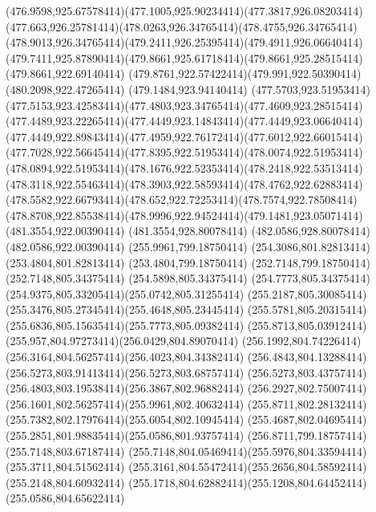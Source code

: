 {{	\curveto(476.9598,925.67578414)(477.1005,925.90234414)(477.3817,926.08203414)
	\curveto(477.663,926.25781414)(478.0263,926.34765414)(478.4755,926.34765414)
	\curveto(478.9013,926.34765414)(479.2411,926.25395414)(479.4911,926.06640414)
	\curveto(479.7411,925.87890414)(479.8661,925.61718414)(479.8661,925.28515414)
	\lineto(479.8661,922.69140414)
	\curveto(479.8761,922.57422414)(479.991,922.50390414)(480.2098,922.47265414)
	\closepath
	\moveto(479.1484,923.94140414)
	\lineto(477.5703,923.51953414)
	\curveto(477.5153,923.42583414)(477.4803,923.34765414)(477.4609,923.28515414)
	\curveto(477.4489,923.22265414)(477.4449,923.14843414)(477.4449,923.06640414)
	\curveto(477.4449,922.89843414)(477.4959,922.76172414)(477.6012,922.66015414)
	\curveto(477.7028,922.56645414)(477.8395,922.51953414)(478.0074,922.51953414)
	\curveto(478.0894,922.51953414)(478.1676,922.52353414)(478.2418,922.53513414)
	\curveto(478.3118,922.55463414)(478.3903,922.58593414)(478.4762,922.62883414)
	\curveto(478.5582,922.66793414)(478.652,922.72253414)(478.7574,922.78508414)
	\curveto(478.8708,922.85538414)(478.9996,922.94524414)(479.1481,923.05071414)
	\closepath
	\moveto(481.3554,922.00390414)
	\lineto(481.3554,928.80078414)
	\lineto(482.0586,928.80078414)
	\lineto(482.0586,922.00390414)
	\closepath
	\moveto(255.9961,799.18750414)
	\lineto(254.3086,801.82813414)
	\lineto(253.4804,801.82813414)
	\lineto(253.4804,799.18750414)
	\lineto(252.7148,799.18750414)
	\lineto(252.7148,805.34375414)
	\lineto(254.5898,805.34375414)
	\curveto(254.7773,805.34375414)(254.9375,805.33205414)(255.0742,805.31255414)
	\curveto(255.2187,805.30085414)(255.3476,805.27345414)(255.4648,805.23445414)
	\curveto(255.5781,805.20315414)(255.6836,805.15635414)(255.7773,805.09382414)
	\curveto(255.8713,805.03912414)(255.957,804.97273414)(256.0429,804.89070414)
	\curveto(256.1992,804.74226414)(256.3164,804.56257414)(256.4023,804.34382414)
	\curveto(256.4843,804.13288414)(256.5273,803.91413414)(256.5273,803.68757414)
	\curveto(256.5273,803.43757414)(256.4803,803.19538414)(256.3867,802.96882414)
	\curveto(256.2927,802.75007414)(256.1601,802.56257414)(255.9961,802.40632414)
	\curveto(255.8711,802.28132414)(255.7382,802.17976414)(255.6054,802.10945414)
	\curveto(255.4687,802.04695414)(255.2851,801.98835414)(255.0586,801.93757414)
	\lineto(256.8711,799.18757414)
	\closepath
	\moveto(255.7148,803.67187414)
	\curveto(255.7148,804.05469414)(255.5976,804.33594414)(255.3711,804.51562414)
	\curveto(255.3161,804.55472414)(255.2656,804.58592414)(255.2148,804.60932414)
	\curveto(255.1718,804.62882414)(255.1208,804.64452414)(255.0586,804.65622414)
}}
